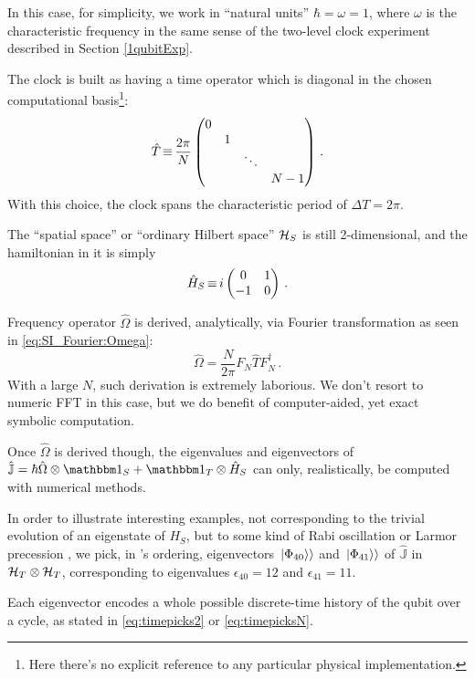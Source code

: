 In this case, for simplicity, we work in
``natural units'' $\hbar = \omega = 1$, where $\omega$ is
the characteristic frequency in the same sense of the
two-level clock experiment described in Section \ref{1qubitExp}.

The clock is built as having a time operator which is diagonal in the
chosen computational basis\footnote{
  Here there's no explicit reference to any particular physical implementation. 
}:
\[
  \hat{T} \operatorname*{\equiv} \frac{2\pi}{N}
  \begin{pmatrix}
    0           &       &       &       \\
                &1      &       &       \\
                &       &\ddots &       \\
                &       &       &N-1
  \end{pmatrix} \,\text{.}
\]
With this choice, the clock spans the characteristic period of $\Delta T = 2\pi$.

The ``spatial space'' or ``ordinary Hilbert space'' $\mathcal{H}_S$
is still 2-dimensional, and the hamiltonian in it is simply
\[
  \hat{H}_S \operatorname*{\equiv}
  i
  \begin{pmatrix}
    0   & 1   \\
    -1  & 0
  \end{pmatrix}
  \, \text{.}
\]

Frequency operator $\hat{\Omega}$ is derived, analytically, via Fourier
transformation as seen in \eqref{eq:SI_Fourier:Omega}:
\[
  \hat{\Omega} = \frac{N}{2\pi} F^{}_{N} \hat{T} F^{\dagger}_{N} \, \text{.}
\]
With a large $N$,
such derivation is extremely laborious. We don't resort to
numeric FFT in this case, but we do benefit of computer-aided, yet exact
symbolic computation.

Once $\hat{\Omega}$ is derived though,
the eigenvalues and eigenvectors of
$\hat{\mathbb{J}} = \hbar\hat{\Omega}\ox\idop_S + \idop_T\ox\hat{H}_S$
can only, realistically, be computed with numerical methods.

In order to illustrate interesting examples, not corresponding to the
trivial evolution of an eigenstate of $H_S$,
but to some kind of Rabi oscillation or Larmor precession
\parencite[Ch. IV]{Cohen-Tannoudji}, we pick, in 's ordering,
eigenvectors $\left.\left| \Phi_{40} \right\rangle\right\rangle$ and $\left.\left| \Phi_{41} \right\rangle\right\rangle$ of $\hat{\mathbb{J}}$
in $\mathcal{H}_T \otimes \mathcal{H}_T$, corresponding to eigenvalues
$\epsilon_{40} = 12$ and $\epsilon_{41} = 11$.

Each eigenvector encodes a whole possible discrete-time history
of the qubit over a cycle,
as stated in \eqref{eq:timepicks2} or \eqref{eq:timepicksN}.

